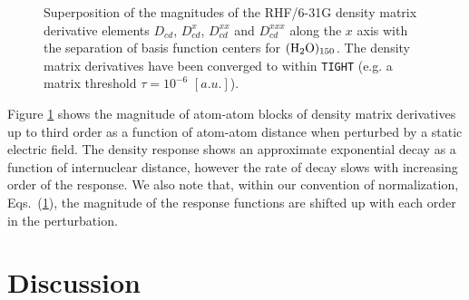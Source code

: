 \documentclass[prl,aps,letterpaper,twocolumn,showpacs,twocolumngrid,superbib]{revtex4}
\begin{document}
\begin{figure}[t]
  \caption{\protect
    Superposition of the magnitudes of the RHF/6-31G density matrix
    derivative elements $D_{cd}$, $D^{x}_{cd}$, $D^{xx}_{cd}$ and $D^{xxx}_{cd}$
    along the $x$ axis with the separation of basis function centers
    for $\rm (H_2O)_{150}$. The density matrix 
    derivatives have been converged to within {\tt TIGHT} (e.g. 
    a matrix threshold $\tau=10^{-6}$ $[a.u.]$).
  }\label{fig:Superposition_Decay}
\end{figure}

Figure \ref{fig:Superposition_Decay} shows the magnitude of atom-atom blocks of density matrix derivatives
up to third order as a function of atom-atom distance when perturbed by a static electric field. 
The density response shows an approximate exponential decay as a function of internuclear distance, 
however the rate of decay slows with increasing order of the response.  We also note that, within
our convention of normalization, Eqs.~(\ref{}), the magnitude of the response functions are shifted
up with each order in the perturbation.

\newpage

\section{Discussion}
\end{document}
